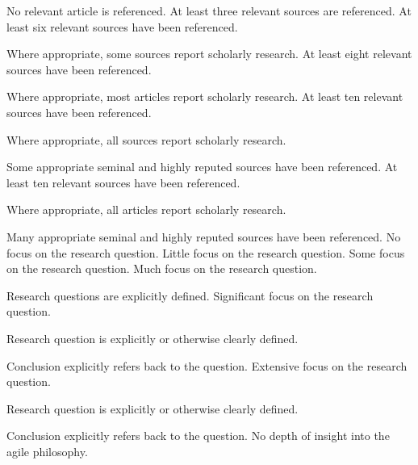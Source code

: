 \documentclass{../fal_assignment}
\begin{document}
\begin{markingrubric}
%
%
        \grade\fail 	No relevant article is referenced.
        \grade 		At least three relevant sources are referenced.
        \grade 		At least six relevant sources have been referenced.
        \par		Where appropriate, some sources report scholarly research.
        \grade 		At least eight relevant sources have been referenced.
        \par		Where appropriate, most articles report scholarly research.
        \grade 		At least ten relevant sources have been referenced.
        \par		Where appropriate, all sources report scholarly research.
        \par		Some appropriate seminal and highly reputed sources have been referenced.      
        \grade 		At least ten relevant sources have been referenced.
        \par		Where appropriate, all articles report scholarly research.
        \par		Many appropriate seminal and highly reputed sources have been referenced.   
%
        \grade\fail 	No focus on the research question.
        \grade 		Little focus on the research question.
        \grade 		Some focus on the research question.
        \grade 		Much focus on the research question.
            \par 		Research questions are explicitly defined.
        \grade 		Significant focus on the research question.
            \par 		Research question is explicitly or otherwise clearly defined.
            \par 		Conclusion explicitly refers back to the question.
        \grade 		Extensive focus on the research question.
            \par 		Research question is explicitly or otherwise clearly defined.
            \par 		Conclusion explicitly refers back to the question.
%
        \grade\fail 	No depth of insight into the agile philosophy.

\end{markingrubric}
\end{document}
